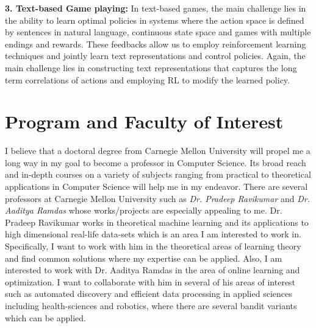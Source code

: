 \documentclass{article}
\begin{document}
\textbf{3. Text-based Game playing:} In text-based games, the main challenge lies in the ability to learn optimal policies in systems where the action space is defined by sentences in natural language, continuous state space and games with multiple endings and rewards. These feedbacks allow us to employ reinforcement learning techniques and jointly learn text representations and control policies. Again, the main challenge lies in constructing text representations that captures the long term correlations of actions and employing RL to modify the learned policy.





\vspace*{-2em}
\section{Program and Faculty of Interest}
\vspace*{-1em}

I believe that a doctoral degree from Carnegie Mellon University will propel me a long way in my goal to become a professor in Computer Science. Its broad reach and in-depth courses on a  variety of subjects ranging from practical to theoretical applications in Computer Science will help me in my endeavor. There are several professors at Carnegie Mellon University such as \textit{Dr. Pradeep Ravikumar} and \textit{Dr. Aaditya Ramdas} whose works/projects are especially appealing to me. Dr. Pradeep Ravikumar works in theoretical machine learning and its applications to high dimensional real-life data-sets which is an area I am interested to work in. Specifically, I want to work with him in the theoretical areas of learning theory and find common solutions where my expertise can be applied. Also, I am interested to work with Dr. Aaditya Ramdas in the area of online learning and optimization. I want to collaborate with him in several of his areas of interest such as automated discovery and efficient data processing in applied sciences including health-sciences and robotics, where there are several bandit variants which can be applied.





\end{document}
